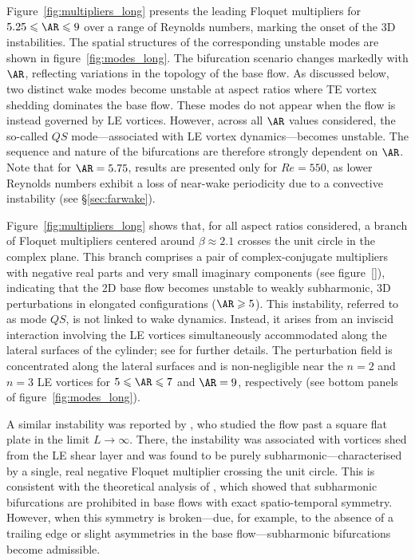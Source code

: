 Figure \ref{fig:multipliers_long} presents the leading Floquet multipliers for $5.25 \le \AR \le 9$ over a range of Reynolds numbers, marking the onset of the 3D instabilities. The spatial structures of the corresponding unstable modes are shown in figure \ref{fig:modes_long}. The bifurcation scenario changes markedly with $\AR$, reflecting variations in the topology of the base flow. As discussed below, two distinct wake modes become unstable at aspect ratios where TE vortex shedding dominates the base flow. These modes do not appear when the flow is instead governed by LE vortices. However, across all $\AR$ values considered, the so-called $QS$ mode---associated with LE vortex dynamics---becomes unstable. The sequence and nature of the bifurcations are therefore strongly dependent on $\AR$. Note that for $\AR = 5.75$, results are presented only for $Re = 550$, as lower Reynolds numbers exhibit a loss of near-wake periodicity due to a convective instability (see \S\ref{sec:farwake}).

Figure \ref{fig:multipliers_long} shows that, for all aspect ratios considered, a branch of Floquet multipliers centered around $\beta \approx 2.1$ crosses the unit circle in the complex plane. This branch comprises a pair of complex-conjugate multipliers with negative real parts and very small imaginary components (see figure \ref{}), indicating that the 2D base flow becomes unstable to weakly subharmonic, 3D perturbations in elongated configurations ($\AR \ge 5$). This instability, referred to as mode $QS$, is not linked to wake dynamics. Instead, it arises from an inviscid interaction involving the LE vortices simultaneously accommodated along the lateral surfaces of the cylinder; see \cite{chiarini-quadrio-auteri-2022d} for further details.
%
The perturbation field is concentrated along the lateral surfaces and is non-negligible near the $n=2$ and $n=3$ LE vortices for $5 \le \AR \le 7$ and $\AR=9$, respectively (see bottom panels of figure \ref{fig:modes_long}).

A similar instability was reported by \cite{chaurasia-thompson-2011}, who studied the flow past a square flat plate in the limit $L\rightarrow \infty$. There, the instability was associated with vortices shed from the LE shear layer and was found to be purely subharmonic---characterised by a single, real negative Floquet multiplier crossing the unit circle. This is consistent with the theoretical analysis of \cite{marques-lopez-blackburn-2004}, which showed that subharmonic bifurcations are prohibited in base flows with exact spatio-temporal symmetry. However, when this symmetry is broken---due, for example, to the absence of a trailing edge or slight asymmetries in the base flow---subharmonic bifurcations become admissible.

